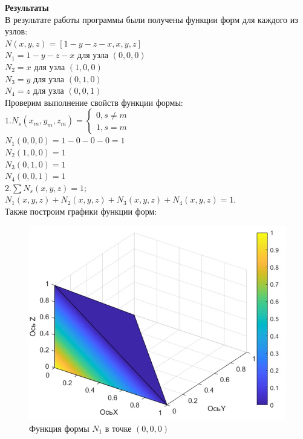 \documentclass[12pt]{article}
\begin{document}
\textbf{Результаты}\\
В результате работы программы были получены функции форм для каждого из узлов:\\
$N(x, y, z) = [1 - y - z - x, x, y, z]$\\
$N_1 = 1 - y - z - x$ для узла $(0,0,0)$\\
$N_2 = x$ для узла $(1,0,0)$\\
$N_3 = y$ для узла $(0,1,0)$\\
$N_4 = z$ для узла $(0,0,1)$\\
Проверим выполнение свойств функции формы:\\
$1. N_s (x_m,y_m,z_m) = \begin{cases} 0, s \neq m \\ 1, s=m \end{cases}$\\
$N_1(0,0,0) = 1 - 0 - 0 - 0 = 1$\\
$N_2(1,0,0) = 1$\\
$N_3(0,1,0) = 1$\\
$N_4(0,0,1) = 1$\\
$2. \sum N_s (x,y,z) = 1;$\\
$N_1(x,y,z) + N_2(x,y,z) + N_3(x,y,z) + N_4(x,y,z) = 1.$\\
\newpage
Также построим графики функции форм:\\
\begin{figure}[h]

\centering

\includegraphics[width=0.6\linewidth]{1.jpg}

\caption{Функция формы $N_1$ в точке $(0,0,0)$}

\label{fig:mpr}

\end{figure}
\end{document}
